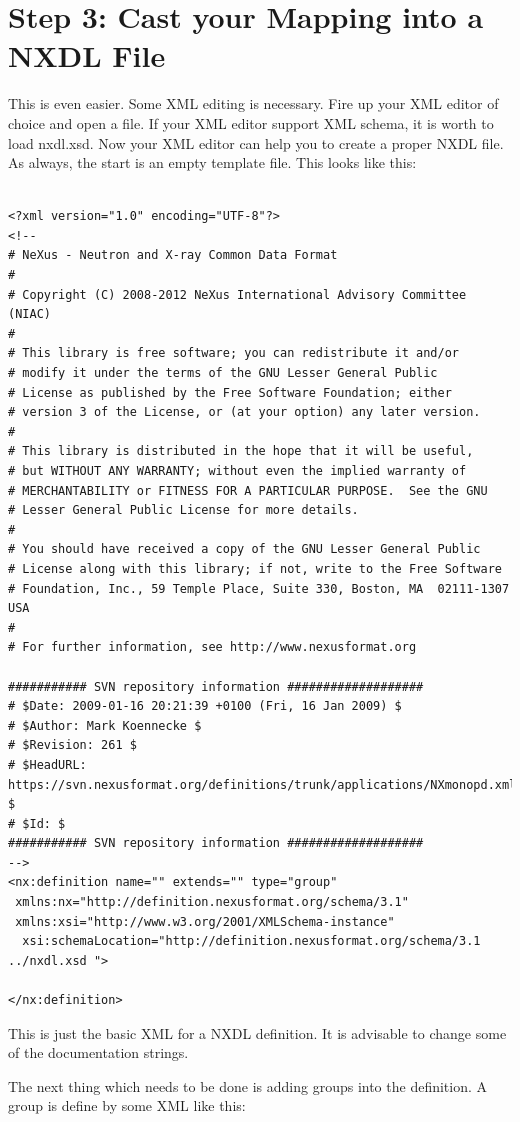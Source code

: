 \documentclass[a4paper]{article}\usepackage[dvips]{graphicx}
\begin{document}
\section{Step 3: Cast your Mapping into a NXDL File }

This is even easier. Some XML editing is necessary. Fire up your XML editor of choice and open a file. 
If your XML editor support XML schema, it is worth to load nxdl.xsd. Now your XML editor can help you to 
create a proper NXDL file. As always, the start is an empty template file. This looks like this:


\begin{verbatim}

<?xml version="1.0" encoding="UTF-8"?>
<!--
# NeXus - Neutron and X-ray Common Data Format
# 
# Copyright (C) 2008-2012 NeXus International Advisory Committee (NIAC)
# 
# This library is free software; you can redistribute it and/or
# modify it under the terms of the GNU Lesser General Public
# License as published by the Free Software Foundation; either
# version 3 of the License, or (at your option) any later version.
#
# This library is distributed in the hope that it will be useful,
# but WITHOUT ANY WARRANTY; without even the implied warranty of
# MERCHANTABILITY or FITNESS FOR A PARTICULAR PURPOSE.  See the GNU
# Lesser General Public License for more details.
#
# You should have received a copy of the GNU Lesser General Public
# License along with this library; if not, write to the Free Software
# Foundation, Inc., 59 Temple Place, Suite 330, Boston, MA  02111-1307  USA
#
# For further information, see http://www.nexusformat.org

########### SVN repository information ###################
# $Date: 2009-01-16 20:21:39 +0100 (Fri, 16 Jan 2009) $
# $Author: Mark Koennecke $
# $Revision: 261 $
# $HeadURL: https://svn.nexusformat.org/definitions/trunk/applications/NXmonopd.xml $
# $Id: $
########### SVN repository information ###################
-->
<nx:definition name="" extends="" type="group" 
 xmlns:nx="http://definition.nexusformat.org/schema/3.1" 
 xmlns:xsi="http://www.w3.org/2001/XMLSchema-instance" 
  xsi:schemaLocation="http://definition.nexusformat.org/schema/3.1 ../nxdl.xsd ">

</nx:definition>
\end{verbatim}
 
This is just the basic XML for a NXDL definition. It is advisable to change some of 
the documentation strings. 


The next thing which needs to be done is adding groups into the definition. A group is 
define by some XML like this:
\end{document}
